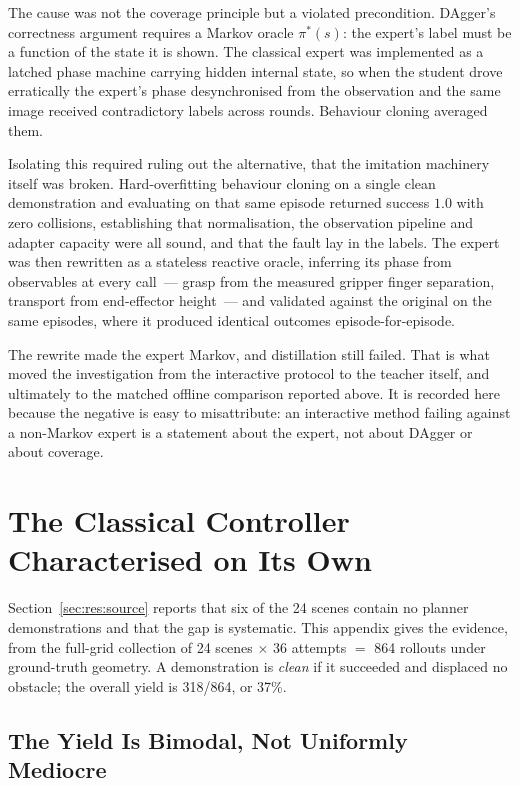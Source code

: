 \documentclass[a4paper,11pt]{report}
\begin{document}
The cause was not the coverage principle but a violated precondition. DAgger's correctness argument
requires a Markov oracle $\pi^{*}(s)$: the expert's label must be a function of the state it is
shown. The classical expert was implemented as a latched phase machine carrying hidden internal
state, so when the student drove erratically the expert's phase desynchronised from the observation
and the same image received contradictory labels across rounds. Behaviour cloning averaged them.

Isolating this required ruling out the alternative, that the imitation machinery itself was broken.
Hard-overfitting behaviour cloning on a single clean demonstration and evaluating on that same
episode returned success $1.0$ with zero collisions, establishing that normalisation, the
observation pipeline and adapter capacity were all sound, and that the fault lay in the labels. The
expert was then rewritten as a stateless reactive oracle, inferring its phase from observables at
every call~--- grasp from the measured gripper finger separation, transport from end-effector
height~--- and validated against the original on the same episodes, where it produced identical
outcomes episode-for-episode.

The rewrite made the expert Markov, and distillation still failed. That is what moved the
investigation from the interactive protocol to the teacher itself, and ultimately to the matched
offline comparison reported above. It is recorded here because the negative is easy to misattribute:
an interactive method failing against a non-Markov expert is a statement about the expert, not about
DAgger or about coverage.

\chapter{The Classical Controller Characterised on Its Own}\label{app:controller}

Section~\ref{sec:res:source} reports that six of the 24 scenes contain no planner demonstrations
and that the gap is systematic. This appendix gives the evidence, from the full-grid collection of
24 scenes $\times$ 36 attempts $=$ 864 rollouts under ground-truth geometry. A demonstration is
\emph{clean} if it succeeded and displaced no obstacle; the overall yield is 318/864, or 37\%.

\section{The Yield Is Bimodal, Not Uniformly Mediocre}
\end{document}
